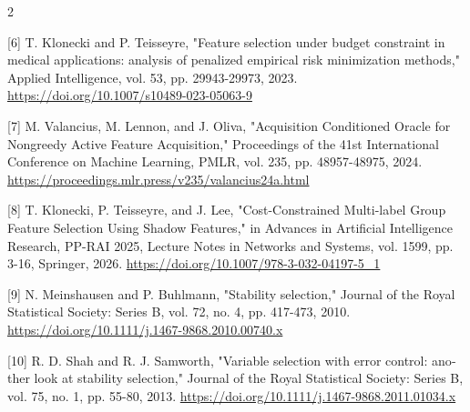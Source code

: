 \documentclass[10pt,a4paper]{article}
\begin{document}
\begin{multicols}{2}
\begin{minipage}{\linewidth}{\fontsize{7}{8.2}\selectfont \begin{latin}[6] T. Klonecki and P. Teisseyre, "Feature selection under budget constraint in medical applications: analysis of penalized empirical risk minimization methods," Applied Intelligence, vol. 53, pp. 29943-29973, 2023. \url{https://doi.org/10.1007/s10489-023-05063-9}\end{latin}\par}\end{minipage}\par
\begin{minipage}{\linewidth}{\fontsize{7}{8.2}\selectfont \begin{latin}[7] M. Valancius, M. Lennon, and J. Oliva, "Acquisition Conditioned Oracle for Nongreedy Active Feature Acquisition," Proceedings of the 41st International Conference on Machine Learning, PMLR, vol. 235, pp. 48957-48975, 2024. \url{https://proceedings.mlr.press/v235/valancius24a.html}\end{latin}\par}\end{minipage}\par
\begin{minipage}{\linewidth}{\fontsize{7}{8.2}\selectfont \begin{latin}[8] T. Klonecki, P. Teisseyre, and J. Lee, "Cost-Constrained Multi-label Group Feature Selection Using Shadow Features," in Advances in Artificial Intelligence Research, PP-RAI 2025, Lecture Notes in Networks and Systems, vol. 1599, pp. 3-16, Springer, 2026. \url{https://doi.org/10.1007/978-3-032-04197-5_1}\end{latin}\par}\end{minipage}\par
\begin{minipage}{\linewidth}{\fontsize{7}{8.2}\selectfont \begin{latin}[9] N. Meinshausen and P. Buhlmann, "Stability selection," Journal of the Royal Statistical Society: Series B, vol. 72, no. 4, pp. 417-473, 2010. \url{https://doi.org/10.1111/j.1467-9868.2010.00740.x}\end{latin}\par}\end{minipage}\par
\begin{minipage}{\linewidth}{\fontsize{7}{8.2}\selectfont \begin{latin}[10] R. D. Shah and R. J. Samworth, "Variable selection with error control: another look at stability selection," Journal of the Royal Statistical Society: Series B, vol. 75, no. 1, pp. 55-80, 2013. \url{https://doi.org/10.1111/j.1467-9868.2011.01034.x}\end{latin}\par}\end{minipage}\par

\end{multicols}
\end{document}
